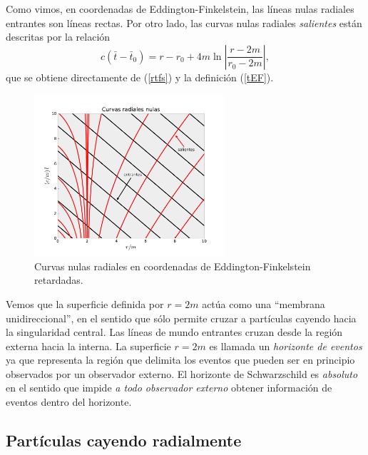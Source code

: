 Como vimos, en coordenadas de Eddington-Finkelstein, las líneas nulas radiales entrantes son líneas rectas. Por otro lado, las curvas nulas radiales \textit{salientes} están descritas por la relación
\begin{equation}
 c(\bar{t}-\bar{t}_0)=r-r_0+4m\ln\left|\frac{r-2m}{r_0-2m}\right|,  \label{rtfsEF}
\end{equation}
que se obtiene directamente de (\ref{rtfs}) y la definición (\ref{tEF}).

\begin{figure}[H]
 \begin{center}
\includegraphics[height=6cm]{fig/fig-nullrays-cEF.pdf}
\caption{Curvas nulas radiales en coordenadas de Eddington-Finkelstein retardadas.}
\label{fig:nullrays-cEF}
\end{center}
\end{figure}

Vemos que la superficie definida por $r=2m$ actúa como una ``membrana unidireccional'', en el sentido que sólo permite cruzar a partículas cayendo hacia la singularidad central. Las líneas de mundo entrantes cruzan desde la región externa hacia la interna. La superficie $r=2m$ es llamada un \textit{horizonte de eventos} ya que representa la región que delimita los eventos que pueden ser en principio observados por un observador externo. El horizonte de Schwarzschild es \textit{absoluto} en el sentido que impide \textit{a todo observador externo} obtener información de eventos dentro del horizonte.

\subsection{Partículas cayendo radialmente}

